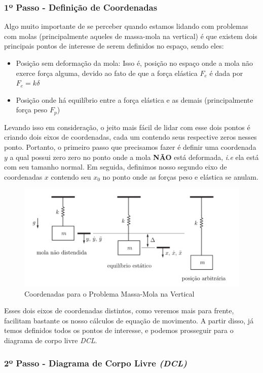 \documentclass{article}
\begin{document}
\subsubsection*{1º Passo - Definição de Coordenadas}

Algo muito importante de se perceber quando estamos lidando com problemas com molas (principalmente aqueles de massa-mola na vertical) é que existem dois principais pontos de
interesse de serem definidos no espaço, sendo eles:
\begin{itemize}
    \item Posição sem deformação da mola: Isso é, posição no espaço onde a mola não exerce força alguma, devido ao fato de que a força elástica $F_e$ é dada por $F_e = k \delta$
    \item Posição onde há equilíbrio entre a força elástica e as demais (principalmente força peso $F_p$)
\end{itemize}

Levando isso em consideração, o jeito mais fácil de lidar com esse dois pontos é criando dois eixos de coordenadas, cada um contendo seus respective zeros nesses ponto.
Portanto, o primeiro passo que precisamos fazer é definir uma coordenada $y$ a qual possui zero zero no ponto onde a mola
\textbf{NÃO} está deformada, \emph{i.e} ela está com seu tamanho normal.
Em seguida, definimos nosso segundo eixo de coordenadas $x$ contendo seu $x_0$ no ponto onde as forças peso e elástica se anulam.

\begin{figure}[h]
    \centering
    \includegraphics[width=.7\linewidth]{imgs/sis_mass_mola_1.png}
    \caption{Coordenadas para o Problema Massa-Mola na Vertical}
\end{figure}

Esses dois eixos de coordenadas distintos, como veremos mais para frente, facilitam bastante os nosso cálculos de equação de movimento.
A partir disso, já temos definidos todos os pontos de interesse, e podemos prosseguir para o diagrama de corpo livre \emph{DCL}.

\subsubsection*{2º Passo - Diagrama de Corpo Livre \emph{(DCL)}}
\end{document}
